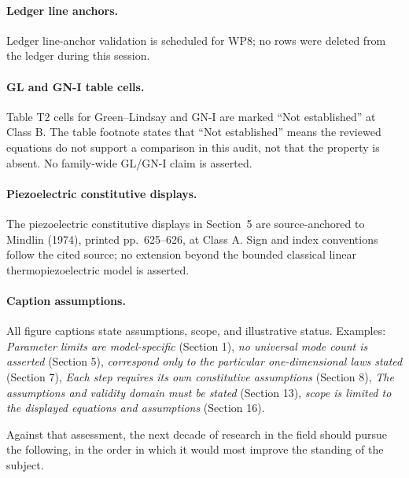 \paragraph{Ledger line anchors.} Ledger line-anchor validation is scheduled for WP8; no rows were deleted from the ledger during this session.

\paragraph{GL and GN-I table cells.} Table T2 cells for Green--Lindsay and GN-I are marked ``Not established'' at Class B. The table footnote states that ``Not established'' means the reviewed equations do not support a comparison in this audit, not that the property is absent. No family-wide GL/GN-I claim is asserted.

\paragraph{Piezoelectric constitutive displays.} The piezoelectric constitutive displays in Section~5 are source-anchored to Mindlin (1974), printed pp.~625--626, at Class A. Sign and index conventions follow the cited source; no extension beyond the bounded classical linear thermopiezoelectric model is asserted.

\paragraph{Caption assumptions.} All figure captions state assumptions, scope, and illustrative status. Examples: \emph{Parameter limits are model-specific} (Section 1), \emph{no universal mode count is asserted} (Section 5), \emph{correspond only to the particular one-dimensional laws stated} (Section 7), \emph{Each step requires its own constitutive assumptions} (Section 8), \emph{The assumptions and validity domain must be stated} (Section 13), \emph{scope is limited to the displayed equations and assumptions} (Section 16).

Against that assessment, the next decade of research in the field should pursue the following, in the order in which it would most improve the standing of the subject.

